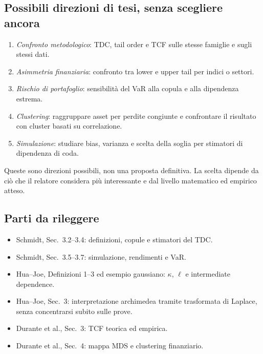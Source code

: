 \documentclass[11pt,a4paper]{article}
\begin{document}
\subsection{Possibili direzioni di tesi, senza scegliere ancora}

\begin{enumerate}
  \item \emph{Confronto metodologico}: TDC, tail order e TCF sulle stesse
  famiglie e sugli stessi dati.
  \item \emph{Asimmetria finanziaria}: confronto tra lower e upper tail per
  indici o settori.
  \item \emph{Rischio di portafoglio}: sensibilità del VaR alla copula e alla
  dipendenza estrema.
  \item \emph{Clustering}: raggruppare asset per perdite congiunte e confrontare
  il risultato con cluster basati su correlazione.
  \item \emph{Simulazione}: studiare bias, varianza e scelta della soglia per
  stimatori di dipendenza di coda.
\end{enumerate}

Queste sono direzioni possibili, non una proposta definitiva. La scelta dipende
da ciò che il relatore considera più interessante e dal livello matematico ed
empirico atteso.

\subsection{Parti da rileggere}

\begin{itemize}
  \item Schmidt, Sec.~3.2--3.4: definizioni, copule e stimatori del TDC.
  \item Schmidt, Sec.~3.5--3.7: simulazione, rendimenti e VaR.
  \item Hua--Joe, Definizioni 1--3 ed esempio gaussiano: $\kappa$, $\ell$ e
  intermediate dependence.
  \par\item Hua--Joe, Sec.~3: interpretazione archimedea tramite trasformata di
  Laplace, senza concentrarsi subito sulle prove.
  \par\item Durante et al., Sec.~3: TCF teorica ed empirica.
  \par\item Durante et al., Sec.~4: mappa MDS e clustering finanziario.
\end{itemize}
\end{document}
